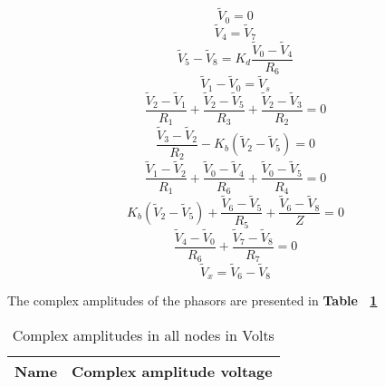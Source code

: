 \begin {equation}
	\tilde{V}_0 = 0
	\label{eq:p1}
\end{equation}
\begin {equation}
	\tilde{V}_4 = \tilde{V}_7
	\label{eq:p2}
\end{equation}
\begin {equation}
	\tilde{V}_5 - \tilde{V}_8 = K_d \frac{\tilde{V}_0 - \tilde{V}_4}{R_6}
	\label{eq:p3}
\end{equation}
\begin {equation}
	\tilde{V}_1 - \tilde{V}_0 = \tilde{V}_s
	\label{eq:p4}
\end{equation}
\begin {equation}
	\frac{\tilde{V}_2-\tilde{V}_1}{R_1} + \frac{\tilde{V}_2 - \tilde{V}_5}{R_3} + \frac{\tilde{V}_2 - \tilde{V}_3}{R_2} = 0
	\label{eq:p5}
\end{equation}
\begin {equation}
	\frac{\tilde{V}_3-\tilde{V}_2}{R_2} - K_b(\tilde{V}_2-\tilde{V}_5)  = 0
	\label{eq:p6}
\end{equation}
\begin {equation}
	\frac{\tilde{V}_1-\tilde{V}_2}{R_1} + \frac{\tilde{V}_0-\tilde{V}_4}{R_6} + \frac{\tilde{V}_0-\tilde{V}_5}{R_4} = 0
	\label{eq:p7}
\end{equation}
\begin {equation}
	K_b(\tilde{V}_2-\tilde{V}_5) + \frac{\tilde{V}_6-\tilde{V}_5}{R_5} + \frac{\tilde{V}_6-\tilde{V}_8}{Z}  = 0
	\label{eq:p8}
\end{equation}
\begin {equation}
	\frac{\tilde{V}_4-\tilde{V}_0}{R_6} + \frac{\tilde{V}_7 - \tilde{V}_8}{R_7} = 0
	\label{eq:p9}
\end{equation}
\begin {equation}
	\tilde{V}_x = \tilde{V}_6 - \tilde{V}_8
	\label{eq:p10}
\end{equation}


The complex amplitudes of the phasors are presented in  \textbf{Table ~\ref{tab:equivalent resistor}}
\begin{table}[H]
  \centering
  \begin{tabular}{|l|r|}
    \hline    
    {\bf Name} & {\bf Complex amplitude voltage}\\ \hline
    
  \end{tabular}
  \vspace{10px}
  \caption{Complex amplitudes in all nodes in Volts}
  \label{tab:equivalent resistor}
\end{table}
\vspace{10cm}

